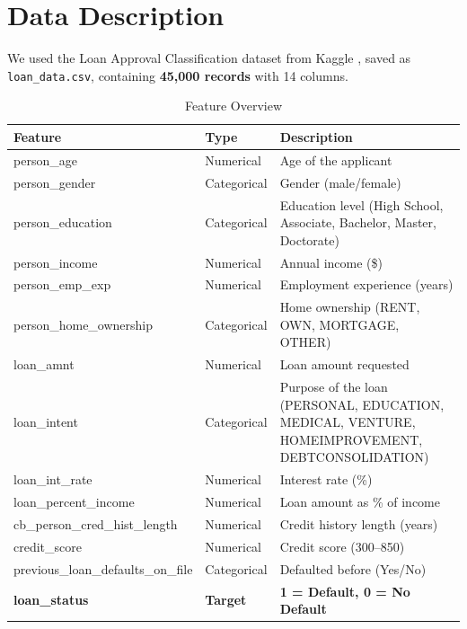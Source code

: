 \documentclass[12pt, a4paper]{article}
\begin{document}
\section{Data Description}

We used the Loan Approval Classification dataset from Kaggle \cite{kaggle_dataset}, saved as \texttt{loan\_data.csv}, containing \textbf{45,000 records} with 14 columns.

\begin{table}[H]
  \centering
  \caption{Feature Overview}
  \begin{tabular}{l l p{7cm}}
    \toprule
    \textbf{Feature} & \textbf{Type} & \textbf{Description} \\
    \midrule
    person\_age             & Numerical   & Age of the applicant \\
    person\_gender          & Categorical & Gender (male/female) \\
    person\_education       & Categorical & Education level (High School, Associate, Bachelor, Master, Doctorate) \\
    person\_income          & Numerical   & Annual income (\$) \\
    person\_emp\_exp        & Numerical   & Employment experience (years) \\
    person\_home\_ownership & Categorical & Home ownership (RENT, OWN, MORTGAGE, OTHER) \\
    loan\_amnt              & Numerical   & Loan amount requested \\
    loan\_intent            & Categorical & Purpose of the loan (PERSONAL, EDUCATION, MEDICAL, VENTURE, HOMEIMPROVEMENT, DEBTCONSOLIDATION) \\
    loan\_int\_rate         & Numerical   & Interest rate (\%) \\
    loan\_percent\_income   & Numerical   & Loan amount as \% of income \\
    cb\_person\_cred\_hist\_length & Numerical & Credit history length (years) \\
    credit\_score           & Numerical   & Credit score (300--850) \\
    previous\_loan\_defaults\_on\_file & Categorical & Defaulted before (Yes/No) \\
    \midrule
    \textbf{loan\_status}   & \textbf{Target} & \textbf{1 = Default, 0 = No Default} \\
    \bottomrule
  \end{tabular}
\end{table}
\end{document}
